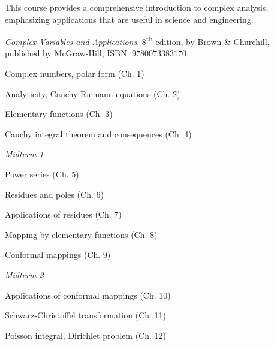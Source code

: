 \documentclass{osucourse}
\begin{document}
\CatalogDescription
\PrerequisitesAndExclusions

\begin{Purpose}
This course provides a comprehensive introduction to complex analysis,
emphasizing applications that are useful in science and engineering.
\end{Purpose}

\begin{Text}
\emph{Complex Variables and Applications}, 8\textsuperscript{th}
edition, by Brown \& Churchill, published by McGraw-Hill, ISBN:
9780073383170
\end{Text}

\begin{TopicsOutline}
Complex numbers, polar form (Ch. 1)

Analyticity, Cauchy-Riemann equations (Ch. 2)

Elementary functions (Ch. 3)

Cauchy integral theorem and consequences (Ch. 4)

\emph{Midterm 1}

Power series (Ch. 5)

Residues and poles (Ch. 6)

Applications of residues (Ch. 7)

Mapping by elementary functions (Ch. 8)

Conformal mappings (Ch. 9)

\emph{Midterm 2}

Applications of conformal mappings (Ch. 10)

Schwarz-Christoffel transformation (Ch. 11)

Poisson integral, Dirichlet problem (Ch. 12)
\end{TopicsOutline}

\begin{SuggestedSchedule}
\end{SuggestedSchedule}
\end{document}

